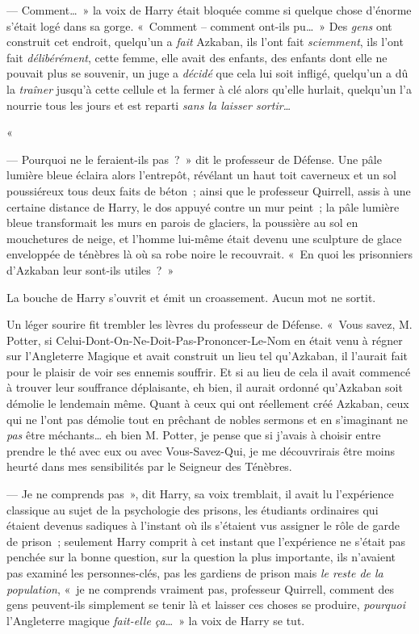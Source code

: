 --- Comment…~»
la voix de Harry était bloquée comme si quelque chose d'énorme s'était logé dans sa gorge.
«~Comment -- comment ont-ils pu…~»
Des \emph{gens} ont construit cet endroit, quelqu'un a \emph{fait} Azkaban, ils l'ont fait \emph{sciemment}, ils l'ont fait \emph{délibérément}, cette femme, elle avait des enfants, des enfants dont elle ne pouvait plus se souvenir, un juge a \emph{décidé} que cela lui soit infligé, quelqu'un a dû la \emph{traîner} jusqu'à cette cellule et la fermer à clé alors qu'elle hurlait, quelqu'un l'a nourrie tous les jours et est reparti \emph{sans la laisser sortir…}

«~

--- Pourquoi ne le feraient-ils pas~?~»
dit le professeur de Défense.
Une pâle lumière bleue éclaira alors l'entrepôt, révélant un haut toit caverneux et un sol poussiéreux tous deux faits de béton~; ainsi que le professeur Quirrell, assis à une certaine distance de Harry, le dos appuyé contre un mur peint~; la pâle lumière bleue transformait les murs en parois de glaciers, la poussière au sol en mouchetures de neige, et l'homme lui-même était devenu une sculpture de glace enveloppée de ténèbres là où sa robe noire le recouvrait.
«~En quoi les prisonniers d'Azkaban leur sont-ils utiles~?~»

La bouche de Harry s'ouvrit et émit un croassement.
Aucun mot ne sortit.

Un léger sourire fit trembler les lèvres du professeur de Défense.
«~Vous savez, M. Potter, si Celui-Dont-On-Ne-Doit-Pas-Prononcer-Le-Nom en était venu à régner sur l'Angleterre Magique et avait construit un lieu tel qu'Azkaban, il l'aurait fait pour le plaisir de voir ses ennemis souffrir.
Et si au lieu de cela il avait commencé à trouver leur souffrance déplaisante, eh bien, il aurait ordonné qu'Azkaban soit démolie le lendemain même.
Quant à ceux qui ont réellement créé Azkaban, ceux qui ne l'ont pas démolie tout en prêchant de nobles sermons et en s'imaginant ne \emph{pas} être méchants… eh bien M. Potter, je pense que si j'avais à choisir entre prendre le thé avec eux ou avec Vous-Savez-Qui, je me découvrirais être moins heurté dans mes sensibilités par le Seigneur des Ténèbres.

--- Je ne comprends pas~», dit Harry, sa voix tremblait, il avait lu l'expérience classique au sujet de la psychologie des prisons, les étudiants ordinaires qui étaient devenus sadiques à l'instant où ils s'étaient vus assigner le rôle de garde de prison~; seulement Harry comprit à cet instant que l'expérience ne s'était pas penchée sur la bonne question, sur la question la plus importante, ils n'avaient pas examiné les personnes-clés, pas les gardiens de prison mais \emph{le reste de la population}, «~je ne comprends vraiment pas, professeur Quirrell, comment des gens peuvent-ils simplement se tenir là et laisser ces choses se produire, \emph{pourquoi} l'Angleterre magique \emph{fait-elle ça}…~»
la voix de Harry se tut.

